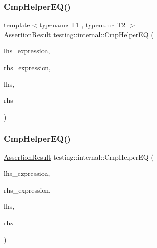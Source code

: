 \subsubsection{\texorpdfstring{Cmp\+Helper\+E\+Q()}{CmpHelperEQ()}\hspace{0.1cm}{\footnotesize\ttfamily [1/2]}}
{\footnotesize\ttfamily template$<$typename T1 , typename T2 $>$ \\
\hyperlink{classtesting_1_1_assertion_result}{Assertion\+Result} testing\+::internal\+::\+Cmp\+Helper\+EQ (\begin{DoxyParamCaption}\item[{const char $\ast$}]{lhs\+\_\+expression,  }\item[{const char $\ast$}]{rhs\+\_\+expression,  }\item[{const T1 \&}]{lhs,  }\item[{const T2 \&}]{rhs }\end{DoxyParamCaption})}

\mbox{\label{namespacetesting_1_1internal_a46582d95cbfe3d3d8f6945c9e9cd779c}} 
\subsubsection{\texorpdfstring{Cmp\+Helper\+E\+Q()}{CmpHelperEQ()}\hspace{0.1cm}{\footnotesize\ttfamily [2/2]}}
{\footnotesize\ttfamily \hyperlink{classtesting_1_1_assertion_result}{Assertion\+Result} testing\+::internal\+::\+Cmp\+Helper\+EQ (\begin{DoxyParamCaption}\item[{const char $\ast$}]{lhs\+\_\+expression,  }\item[{const char $\ast$}]{rhs\+\_\+expression,  }\item[{\hyperlink{namespacetesting_1_1internal_a05c6bd9ede5ccdf25191a590d610dcc6}{Biggest\+Int}}]{lhs,  }\item[{\hyperlink{namespacetesting_1_1internal_a05c6bd9ede5ccdf25191a590d610dcc6}{Biggest\+Int}}]{rhs }\end{DoxyParamCaption})}

\mbox{\label{namespacetesting_1_1internal_a1def8ec9393360a1b34a20528703e7f7}} 
